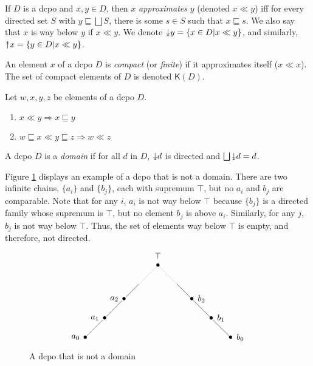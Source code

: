 \begin{definition}
If $D$ is a dcpo and $x,y\in D$, then $x$ \emph{approximates} $y$ (denoted $x \ll y$) iff for every directed set $S$ with $y\sqsubseteq \bigsqcup S$, there is some $s\in S$ such that $x\sqsubseteq s$.  We also say that $x$ is way below $y$ if $x\ll y$.  We denote $\Da y = \{x\in D | x \ll y\}$, and similarly, $\Ua x=\{y\in D | x\ll y\}$.  
\end{definition}

\begin{definition}
An element $x$ of a dcpo $D$ is \emph{compact} (or \emph{finite}) if it approximates itself ($x\ll x$).  The set of compact elements of $D$ is denoted $\mathsf{K}(D)$.
\end{definition}

\begin{proposition}
Let $w,x,y,z$ be elements of a dcpo $D$.
\begin{enumerate}
\item $x\ll y \Rightarrow x\sqsubseteq y$
\item $w\sqsubseteq x \ll y \sqsubseteq z \Rightarrow w\ll z$
\end{enumerate}
\end{proposition}

\begin{definition}
A dcpo $D$ is a \emph{domain} if for all $d$ in $D$, $\Da d$ is directed and $\bigsqcup \Da d = d$.
\end{definition}

\begin{example}
Figure \ref{nondomain} displays an example of a dcpo that is not a domain.  There are two infinite chains, $\{a_i\}$ and $\{b_j\}$, each with supremum $\top$, but no $a_i$ and $b_j$ are comparable.  Note that for any $i$, $a_i$ is not way below $\top$ because $\{b_j\}$ is a directed family whose supremum is $\top$, but no element $b_j$ is above $a_i$.  Similarly, for any $j$, $b_j$ is not way below $\top$.  Thus, the set of elements way below $\top$ is empty, and therefore, not directed.  

\begin{figure}
\[
\begin{xy}
(0,0)*{\bullet} = "v0" + (-4,0)*{a_0};
(8,8)*{\bullet} = "v1" + (-4,0)*{a_1};%
(16,16)*{\bullet} = "v2" + (-4,0)*{a_2};%
(22,22)*{} = "v7";%
(30,30)*{\bullet} = "v3" + (0,4)*{\top};%
(38,22)*{} = "v8";%
(44,16)*{\bullet} = "v4" + (4,0)*{b_2};
(52,8)*{\bullet} = "v5" + (4,0)*{b_1};%
(60,0)*{\bullet} = "v6" + (4,0)*{b_0};%
{\ar@{-} "v1"; "v0"};%
{\ar@{-} "v1"; "v2"};%
{\ar@{-} "v2"; "v7"};%
{\ar@{-} "v8"; "v4"};%
{\ar@{-} "v4"; "v5"};%
{\ar@{-} "v5"; "v6"};%
{\ar@{.} "v7"; "v3"};%
{\ar@{.} "v8"; "v3"};%
\end{xy}
\]
\caption{A dcpo that is not a domain} \label{nondomain}
\end{figure}
\end{example}

